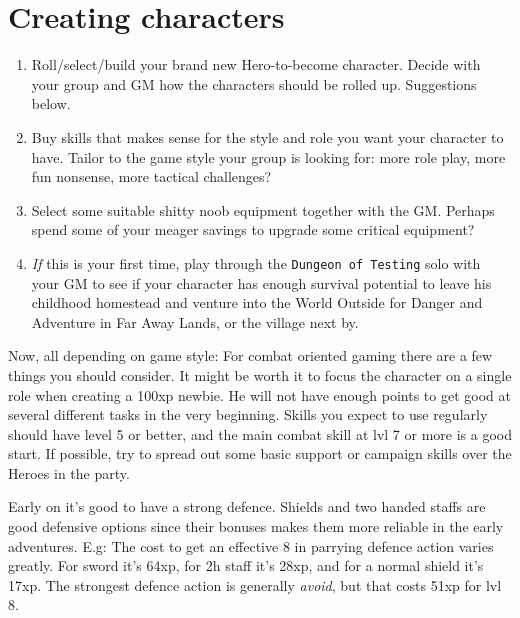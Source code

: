 \section*{Creating characters}
\begin{enumerate}
\item Roll/select/build your brand new Hero-to-become character. Decide with your group and GM how the characters should be rolled up. Suggestions below.
\item Buy skills that makes sense for the style and role you want your character to have. Tailor to the game style your group is looking for: more role play, more fun nonsense, more tactical challenges?
\item Select some suitable shitty noob equipment together with the GM. Perhaps spend some of your meager savings to upgrade some critical equipment?
\item \emph{If} this is your first time, play through the \texttt{Dungeon of Testing} solo with your GM to see if your character has enough survival potential to leave his childhood homestead and venture into the World Outside for Danger and Adventure in Far Away Lands, or the village next by.
\end{enumerate}

Now, all depending on game style: For combat oriented gaming there are a few things you should consider. It might be worth it to focus the character on a single role when creating a 100xp newbie. He will not have enough points to get good at several different tasks in the very beginning. Skills you expect to use regularly should have level 5 or better, and the main combat skill at lvl 7 or more is a good start. If possible, try to spread out some basic support or campaign skills over the Heroes in the party.

Early on it's good to have a strong defence. Shields and two handed staffs are good defensive options since their bonuses makes them more reliable in the early adventures. E.g: The cost to get an effective 8 in parrying defence action varies greatly. For sword it's 64xp, for 2h staff it's 28xp, and for a normal shield it's 17xp. The strongest defence action is generally \emph{avoid}, but that costs 51xp for lvl 8.

